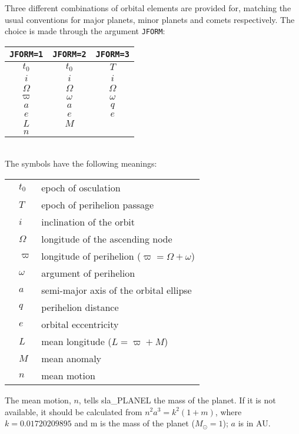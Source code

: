 \documentclass[11pt,twoside,nolof]{starlink}
\begin{document}
Three different combinations of orbital elements are
provided for, matching the usual conventions
for major planets, minor planets and
comets respectively.  The choice is made through the
argument \texttt{JFORM}:

\vspace{1ex}
\hspace{3em}
\begin{tabular}{|c|c|c|} \hline
\texttt{JFORM=1} & \texttt{JFORM=2} & \texttt{JFORM=3} \\
\hline \hline
$t_0$ & $t_0$ & $T$ \\
\hline
$i$ & $i$ & $i$ \\
\hline
$\Omega$ & $\Omega$ & $\Omega$ \\
\hline
$\varpi$ & $\omega$ & $\omega$ \\
\hline
$a$ & $a$ & $q$ \\
\hline
$e$ & $e$ & $e$ \\
\hline
$L$ & $M$ & \\
\hline
$n$ & & \\
\hline
\end{tabular}\\[2ex]
The symbols have the following meanings:

\vspace{-1ex}

\begin{tabular}{lll}
& $t_0$ & epoch of osculation \\
& $T$ & epoch of perihelion passage \\
& $i$ & inclination of the orbit \\
& $\Omega$ & longitude of the ascending node \\
& $\varpi$ & longitude of perihelion ($\varpi = \Omega + \omega$) \\
& $\omega$ & argument of perihelion \\
& $a$ & semi-major axis of the orbital ellipse \\
& $q$ & perihelion distance \\
& $e$ & orbital eccentricity \\
& $L$ & mean longitude ($L = \varpi + M$) \\
& $M$ & mean anomaly \\
& $n$ & mean motion \\
\end{tabular}

The mean motion, $n$, tells
sla\_PLANEL the mass of the planet.
If it is not available, it should be calculated
from $n^2 a^3 = k^2 (1+m)$, where $k = 0.01720209895$ and
m is the mass of the planet ($M_\odot = 1$); $a$ is in AU.
\end{document}
